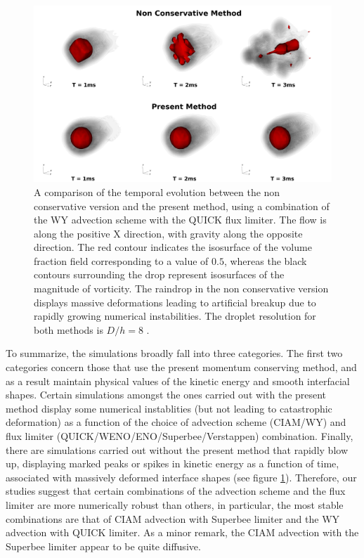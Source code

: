 \vspace*{0.2cm}

\begin{figure}[h!]
\begin{center}
\includegraphics[scale = 0.135]{Figures/Sagar/comparison.png}
\end{center}
\vspace*{-0.5cm}
\caption{A comparison of the temporal evolution between the non conservative version and the present method, using a combination of the WY advection scheme with the QUICK flux limiter. The flow is along the positive X direction, with gravity along the opposite direction. The red contour indicates the isosurface of the volume fraction field corresponding to a value of $0.5$, whereas the black contours surrounding the drop represent isosurfaces of the magnitude of vorticity. The raindrop in the non conservative version displays massive deformations leading to artificial breakup due to rapidly growing numerical instabilities. The droplet resolution for both methods is $D/h = 8$ .}
\label{compare}
\end{figure}

To summarize, the simulations broadly fall into three categories. The first two categories concern those that use the present momentum conserving method, and as a result maintain physical values of the kinetic energy and smooth interfacial shapes. Certain simulations amongst the ones carried out with the present method display some numerical instablities (but not leading to catastrophic deformation) as a function of the choice of advection scheme (CIAM/WY) and flux limiter (QUICK/WENO/ENO/Superbee/Verstappen) combination. Finally, there are simulations carried out without the present method that rapidly blow up, displaying marked peaks or spikes in kinetic energy as a function of time, associated with massively deformed interface shapes (see figure \ref{compare}). Therefore, our studies suggest that certain combinations of the advection scheme and the flux limiter are more numerically robust than others, in particular, the most stable combinations are that of CIAM advection with Superbee limiter and the WY advection with QUICK limiter. As a minor remark, the CIAM advection with the Superbee limiter appear to be quite diffusive. 

